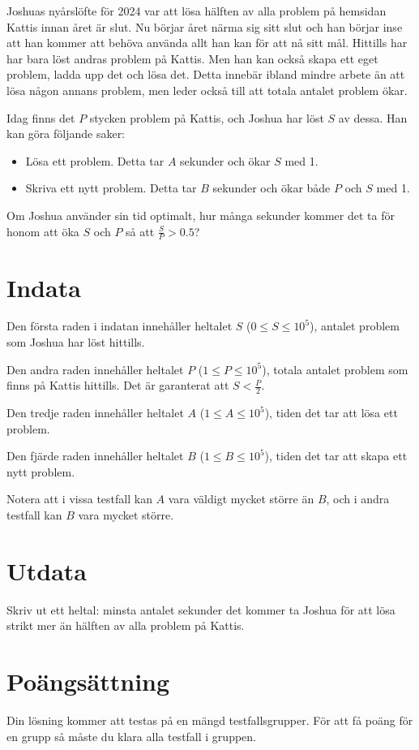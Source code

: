 Joshuas nyårslöfte för 2024 var att lösa hälften av alla problem på hemsidan Kattis innan året är slut. 
Nu börjar året närma sig sitt slut och han börjar inse att han kommer att behöva använda allt han kan för att nå sitt mål.
Hittills har har bara löst andras problem på Kattis. Men han kan också skapa ett eget problem, ladda upp det och lösa det.
Detta innebär ibland mindre arbete än att lösa någon annans problem, men leder också till att totala antalet problem ökar.

Idag finns det $P$ stycken problem på Kattis, och Joshua har löst $S$ av dessa. Han kan göra följande saker:

\begin{itemize}
  \item Lösa ett problem. Detta tar $A$ sekunder och ökar $S$ med 1.
  \item Skriva ett nytt problem. Detta tar $B$ sekunder och ökar både $P$ och $S$ med 1.
\end{itemize}

Om Joshua använder sin tid optimalt, hur många sekunder kommer det ta för honom att öka $S$ och $P$ så att
$\frac{S}{P} > 0.5$?

\section*{Indata}
Den första raden i indatan innehåller heltalet $S$ ($0 \leq S \leq 10^5$), antalet problem som Joshua har
löst hittills.

Den andra raden innehåller heltalet $P$ ($1 \leq P \leq 10^5$), totala antalet problem som finns
på Kattis hittills. Det är garanterat att $S < \frac{P}{2}$.

Den tredje raden innehåller heltalet $A$ ($1 \leq A \leq 10^5$), tiden det tar att lösa ett problem.

Den fjärde raden innehåller heltalet $B$ ($1 \leq B \leq 10^5$), tiden det tar att skapa ett nytt problem.

Notera att i vissa testfall kan $A$ vara väldigt mycket större än $B$, och i andra testfall kan $B$ vara mycket större.

\section*{Utdata}
Skriv ut ett heltal: minsta antalet sekunder det kommer ta Joshua för att lösa strikt mer än hälften
av alla problem på Kattis.

\section*{Poängsättning}
Din lösning kommer att testas på en mängd testfallsgrupper.
För att få poäng för en grupp så måste du klara alla testfall i gruppen.

